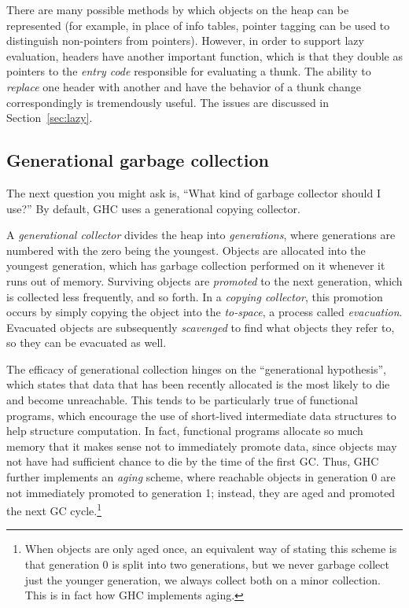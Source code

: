There are many possible methods by which objects on the heap can be
represented (for example, in place of info tables, pointer tagging can
be used to distinguish non-pointers from pointers).  However, in order
to support lazy evaluation, headers have
another important function, which is that they double as pointers to the
\emph{entry code} responsible for evaluating a thunk.  The ability to \emph{replace}
one header with another and have the behavior of a thunk change
correspondingly is tremendously useful.  The issues are discussed in Section~\ref{sec:lazy}.

\subsection{Generational garbage collection}

The next question you might ask is, ``What kind of garbage collector
should I use?''  By default, GHC uses a generational copying collector.

A \emph{generational collector} divides the heap into
\emph{generations}, where generations are numbered with the zero being
the youngest.  Objects are allocated into the youngest generation, which
has garbage collection performed on it whenever it runs out of memory.
Surviving objects are \emph{promoted} to the next generation, which is
collected less frequently, and so forth.  In a \emph{copying collector}, this
promotion occurs by simply copying the object into the \emph{to-space},
a process called \emph{evacuation}.  Evacuated objects are subsequently
\emph{scavenged} to find what objects they refer to, so they can be evacuated as well.



The efficacy of generational collection hinges on the ``generational
hypothesis'', which states that data that has been recently allocated is
the most likely to die and become unreachable.  This tends to be
particularly true of functional programs, which encourage the use of short-lived
intermediate data structures to help structure computation.  In fact,
functional programs allocate so much memory that it makes sense not to
immediately promote data, since objects may not have had sufficient
chance to die by the time of the first GC.  Thus, GHC further implements
an \emph{aging} scheme, where reachable objects in generation 0 are not
immediately promoted to generation 1; instead, they are aged and
promoted the next GC cycle.\footnote{When objects are only aged once, an
equivalent way of stating this scheme is that generation 0 is split into
two generations, but we never garbage collect just the younger
generation, we always collect both on a minor collection.  This is in fact
how GHC implements aging.}

